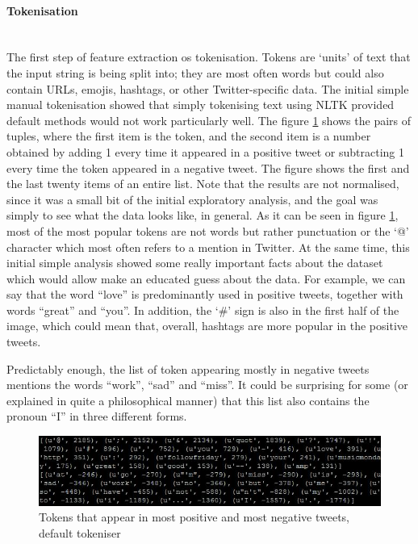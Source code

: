 \paragraph{Tokenisation}\mbox{}\\
The first step of feature extraction os tokenisation. Tokens are `units' of text that the input string is being split into; they are most often words but could also contain URLs, emojis, hashtags, or other Twitter-specific data. The initial simple manual tokenisation showed that simply tokenising text using NLTK provided default methods would not work particularly well. The figure \ref{fig:manual_tok} shows the pairs of tuples, where the first item is the token, and the second item is a number obtained by adding 1 every time it appeared in a positive tweet or subtracting 1 every time the token appeared in a negative tweet. The figure shows the first and the last twenty items of an entire list. Note that the results are not normalised, since it was a small bit of the initial exploratory analysis, and the goal was simply to see what the data looks like, in general. As it can be seen in figure \ref{fig:manual_tok}, most of the most popular tokens are not words but rather punctuation or the `@' character which most often refers to a mention in Twitter. At the same time, this initial simple analysis showed some really important facts about the dataset which would allow make an educated guess about the data. For example, we can say that the word ``love'' is predominantly used in positive tweets, together with words ``great'' and ``you''. In addition, the `\#' sign is also in the first half of the image, which could mean that, overall, hashtags are more popular in the positive tweets.

Predictably enough, the list of token appearing mostly in negative tweets mentions the words ``work'', ``sad'' and ``miss''. It could be surprising for some (or explained in quite a philosophical manner) that this list also contains the pronoun ``I'' in three different forms. 

\begin{figure}
    \centering
    \includegraphics[width=\textwidth]{most_pos_neg}
    \caption{Tokens that appear in most positive and most negative tweets, default tokeniser}
    \label{fig:manual_tok}
\end{figure}

